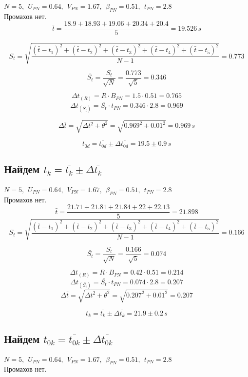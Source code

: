 \documentclass[a4paper,12pt]{report}
\begin{document}
$N=5,\ \ U_{PN}=0.64,\ \ V_{PN}=1.67,\ \ \beta_{PN}=0.51,\ \ t_{PN}=2.8$\\
Промахов нет.\\

\[\bar{t}= \frac{18.9+18.93+19.06+20.34+20.4}{5} = 19.526 \, s\]

\[S_{t}=\sqrt{\frac{(\bar{t}-{t}_1)^2+(\bar{t}-{t}_2)^2+(\bar{t}-{t}_3)^2+(\bar{t}-{t}_4)^2+(\bar{t}-{t}_5)^2}{N-1}} = 0.773\]

\[ \bar{S_{t}}=\frac{S_{t}}{\sqrt{N}}=\frac{0.773}{\sqrt{5}}=0.346 \]

\[ \Delta{t}_{(R)}=R\cdot B_{PN}=1.5\cdot 0.51=0.765 \]
\[ \Delta{t}_{(\bar{S_{t}})}=\bar{S_t}\cdot t_{PN}=0.346\cdot 2.8=0.969 \]

\[ \Delta{\bar{t}}=\sqrt{\Delta t^2 + \theta^2}=\sqrt{0.969^2 + 0.01^2}=0.969 \, s\]

\[ {t_{0d}}=\bar{t_{0d}}\pm \Delta{\bar{t_{0d}}}=19.5\pm 0.9 \, s\]


\subsection*{Найдем $t_{k} = \bar{t_{k}} \pm \Delta \bar{t_{k}}$}

$N=5,\ \ U_{PN}=0.64,\ \ V_{PN}=1.67,\ \ \beta_{PN}=0.51,\ \ t_{PN}=2.8$\\
Промахов нет.\\

\[\bar{t}= \frac{21.71+21.81+21.84+22+22.13}{5} =21.898 \]
\[S_{t}=\sqrt{\frac{(\bar{t}-{t}_1)^2+(\bar{t}-{t}_2)^2+(\bar{t}-{t}_3)^2+(\bar{t}-{t}_4)^2+(\bar{t}-{t}_5)^2}{N-1}} = 0.166\]

\[ \bar{S_{t}}=\frac{S_{t}}{\sqrt{N}}=\frac{0.166}{\sqrt{5}}=0.074 \]

\[ \Delta{t}_{(R)}=R\cdot B_{PN}=0.42\cdot 0.51=0.214 \]
\[ \Delta{t}_{(\bar{S_{t}})}=\bar{S_t}\cdot t_{PN}=0.074\cdot 2.8=0.207 \]
\[ \Delta{\bar{t}}=\sqrt{\Delta t^2 + \theta^2}=\sqrt{0.207^2 + 0.01^2}=0.207 \]

\[ {t_k}=\bar{t_k}\pm \Delta{\bar{t_k}}=21.9\pm 0.2 \, s\]

\subsection*{Найдем $t_{0k} = \bar{t_{0k}} \pm \Delta \bar{t_{0k}}$}

$N=5,\ \ U_{PN}=0.64,\ \ V_{PN}=1.67,\ \ \beta_{PN}=0.51,\ \ t_{PN}=2.8$\\
Промахов нет.\\
\end{document}
